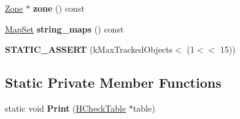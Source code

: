 \begin{DoxyCompactItemize}
\item 
\hyperlink{classv8_1_1internal_1_1_zone}{Zone} $\ast$ {\bfseries zone} () const \hypertarget{classv8_1_1internal_1_1_h_check_table_af5ccfa2ad1ff5a56d278f827bc6d603c}{}\label{classv8_1_1internal_1_1_h_check_table_af5ccfa2ad1ff5a56d278f827bc6d603c}

\item 
\hyperlink{classv8_1_1internal_1_1_unique_set}{Map\+Set} {\bfseries string\+\_\+maps} () const \hypertarget{classv8_1_1internal_1_1_h_check_table_a3605839a0844b899146eedbd9409833b}{}\label{classv8_1_1internal_1_1_h_check_table_a3605839a0844b899146eedbd9409833b}

\item 
{\bfseries S\+T\+A\+T\+I\+C\+\_\+\+A\+S\+S\+E\+RT} (k\+Max\+Tracked\+Objects$<$ (1$<$$<$ 15))\hypertarget{classv8_1_1internal_1_1_h_check_table_a3c21dea96aa29ed5dd7670dda8f4d117}{}\label{classv8_1_1internal_1_1_h_check_table_a3c21dea96aa29ed5dd7670dda8f4d117}

\end{DoxyCompactItemize}
\subsection*{Static Private Member Functions}
\begin{DoxyCompactItemize}
\item 
static void {\bfseries Print} (\hyperlink{classv8_1_1internal_1_1_h_check_table}{H\+Check\+Table} $\ast$table)\hypertarget{classv8_1_1internal_1_1_h_check_table_a0a010fbeff53e95953b721f6f935b1e0}{}\label{classv8_1_1internal_1_1_h_check_table_a0a010fbeff53e95953b721f6f935b1e0}

\end{DoxyCompactItemize}
